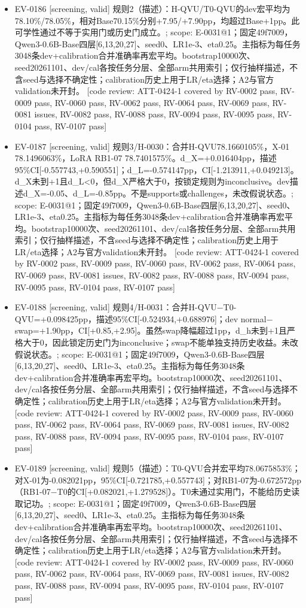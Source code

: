 \documentclass[11pt]{article}
\begin{document}
\begin{itemize}
\item EV-0186 [screening, valid] 规则2（描述）：H-QVU/T0-QVU的dev宏平均为78.10\%/78.05\%，相对Base70.15\%分别+7.95/+7.90pp，均超过Base+1pp。此可学性通过不等于实用门或历史门成立。; scope: E-0031@1；固定49f7009，Qwen3-0.6B-Base四层[6,13,20,27]、seed0、LR1e-3、eta0.25。主指标为每任务3048条dev+calibration合并准确率再宏平均。bootstrap10000次、seed20261101、dev/cal各按任务分层、全部arm共用索引；仅行抽样描述，不含seed与选择不确定性；calibration历史上用于LR/eta选择；A2与官方validation未开封。 [code review: ATT-0424-1 covered by RV-0002 pass, RV-0009 pass, RV-0060 pass, RV-0062 pass, RV-0064 pass, RV-0069 pass, RV-0081 issues, RV-0082 pass, RV-0088 pass, RV-0094 pass, RV-0095 pass, RV-0104 pass, RV-0107 pass]
\item EV-0187 [screening, valid] 规则3/H-0030：合并H-QVU78.1660105\%，X-01 78.1496063\%，LoRA RB1-07 78.7401575\%。d\_X=+0.016404pp，描述95\%CI[-0.557743,+0.590551]；d\_L=-0.574147pp，CI[-1.213911,+0.049213]。d\_X未到+1且d\_L\textless{}0，但d\_X严格大于0，按锁定规则为inconclusive。dev描述d\_X=-0.05、d\_L=-0.85pp。不是supports或challenges，未改假说状态。; scope: E-0031@1；固定49f7009，Qwen3-0.6B-Base四层[6,13,20,27]、seed0、LR1e-3、eta0.25。主指标为每任务3048条dev+calibration合并准确率再宏平均。bootstrap10000次、seed20261101、dev/cal各按任务分层、全部arm共用索引；仅行抽样描述，不含seed与选择不确定性；calibration历史上用于LR/eta选择；A2与官方validation未开封。 [code review: ATT-0424-1 covered by RV-0002 pass, RV-0009 pass, RV-0060 pass, RV-0062 pass, RV-0064 pass, RV-0069 pass, RV-0081 issues, RV-0082 pass, RV-0088 pass, RV-0094 pass, RV-0095 pass, RV-0104 pass, RV-0107 pass]
\item EV-0188 [screening, valid] 规则4/H-0031：合并H-QVU\ensuremath{-}T0-QVU=+0.098425pp，描述95\%CI[-0.524934,+0.688976]；dev normal\ensuremath{-}swap=+1.90pp，CI[+0.85,+2.95]。虽然swap降幅超过1pp，d\_h未到+1且严格大于0，因此锁定历史门为inconclusive；swap不能单独支持历史收益。未改假说状态。; scope: E-0031@1；固定49f7009，Qwen3-0.6B-Base四层[6,13,20,27]、seed0、LR1e-3、eta0.25。主指标为每任务3048条dev+calibration合并准确率再宏平均。bootstrap10000次、seed20261101、dev/cal各按任务分层、全部arm共用索引；仅行抽样描述，不含seed与选择不确定性；calibration历史上用于LR/eta选择；A2与官方validation未开封。 [code review: ATT-0424-1 covered by RV-0002 pass, RV-0009 pass, RV-0060 pass, RV-0062 pass, RV-0064 pass, RV-0069 pass, RV-0081 issues, RV-0082 pass, RV-0088 pass, RV-0094 pass, RV-0095 pass, RV-0104 pass, RV-0107 pass]
\item EV-0189 [screening, valid] 规则5（描述）：T0-QVU合并宏平均78.0675853\%；对X-01为-0.082021pp，95\%CI[-0.721785,+0.557743]；对RB1-07为-0.672572pp（RB1-07\ensuremath{-}T0的CI[+0.082021,+1.279528]）。T0未通过实用门，不能给历史读取记功。; scope: E-0031@1；固定49f7009，Qwen3-0.6B-Base四层[6,13,20,27]、seed0、LR1e-3、eta0.25。主指标为每任务3048条dev+calibration合并准确率再宏平均。bootstrap10000次、seed20261101、dev/cal各按任务分层、全部arm共用索引；仅行抽样描述，不含seed与选择不确定性；calibration历史上用于LR/eta选择；A2与官方validation未开封。 [code review: ATT-0424-1 covered by RV-0002 pass, RV-0009 pass, RV-0060 pass, RV-0062 pass, RV-0064 pass, RV-0069 pass, RV-0081 issues, RV-0082 pass, RV-0088 pass, RV-0094 pass, RV-0095 pass, RV-0104 pass, RV-0107 pass]

\end{itemize}
\end{document}

